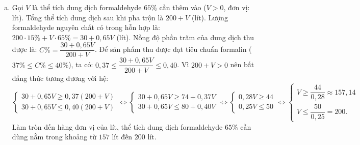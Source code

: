 \begin{bt}
{\begin{enumerate}[a)]
    \item Gọi $V$ là thể tích dung dịch formaldehyde $65\%$ cần thêm vào ($V > 0$, đơn vị: lít).
    Tổng thể tích dung dịch sau khi pha trộn là $200 + V$ (lít).
    Lượng formaldehyde nguyên chất có trong hỗn hợp là:
    $200 \cdot 15\% + V \cdot 65\% = 30 + 0{,}65V$ (lít).
    Nồng độ phần trăm của dung dịch thu được là:
    $C\% = \dfrac{30 + 0{,}65V}{200 + V}$.
    Để sản phẩm thu được đạt tiêu chuẩn formalin ($37\% \le C\% \le 40\%$), ta có:
    $0{,}37 \le \dfrac{30 + 0{,}65V}{200 + V} \le 0{,}40$.
    Vì $200 + V > 0$ nên bất đẳng thức tương đương với hệ:
    $\begin{cases} 30 + 0{,}65V \ge 0{,}37(200 + V) \\ 30 + 0{,}65V \le 0{,}40(200 + V) \end{cases} \iff \begin{cases} 30 + 0{,}65V \ge 74 + 0{,}37V \\ 30 + 0{,}65V \le 80 + 0{,}40V \end{cases} \iff \begin{cases} 0{,}28V \ge 44 \\ 0{,}25V \le 50 \end{cases} \iff \begin{cases} V \ge \dfrac{44}{0{,}28} \approx 157{,}14 \\ V \le \dfrac{50}{0{,}25} = 200. \end{cases}$
    Làm tròn đến hàng đơn vị của lít, thể tích dung dịch formaldehyde $65\%$ cần dùng nằm trong khoảng từ $157$ lít đến $200$ lít.
\end{enumerate}
}
\end{bt}

